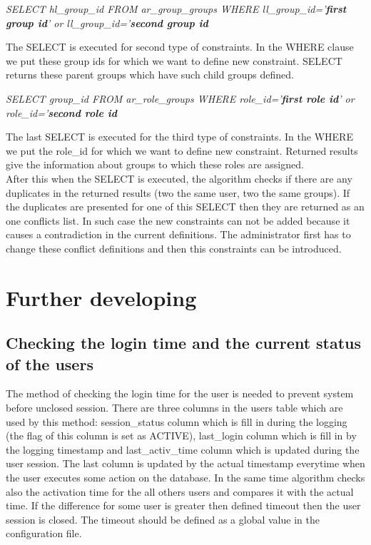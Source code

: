 \begin{center}
\emph{SELECT hl\_group\_id FROM ar\_group\_groups WHERE
ll\_group\_id='}\textbf{\emph{first group id}}\emph{' or ll\_group\_id='}\textbf{\emph{second group id}}
\end{center}
The SELECT is executed for second type of constraints. In the WHERE clause we put these group ids for which we want to define new constraint. SELECT returns these parent groups which have such child groups defined.\\
 
\begin{center}
\emph{SELECT group\_id FROM ar\_role\_groups WHERE
role\_id='}\textbf{\emph{first role id}}\emph{' or role\_id='}\textbf{\emph{second role id}}
\end{center}
The last SELECT is executed for the third type of constraints. In the WHERE we put the role\_id for which we want to define new constraint. Returned results give the information about groups to which these roles are assigned.\\

After this when the SELECT is executed, the algorithm checks if there are any duplicates in the returned results (two the same user, two the same groups). If the duplicates are presented  for one of this SELECT then they are returned as an one conflicts list. In such case the new constraints can not be added because it causes a contradiction in the current definitions. The administrator first has to change these conflict definitions and then this constraints can be introduced.
\newpage
\section{Further developing\label{furtherdev}}

\subsection{Checking the login time and the current status of the users\label{furtherdevchecking}}
The method of checking the login time for the user is needed to prevent system before unclosed session. There are three columns in the users table which are used by this method: session\_status column which is fill in during the logging (the flag of this column is set as ACTIVE), last\_login column which is fill in by the logging timestamp and last\_activ\_time column which is updated during the user session. The last column is updated by the actual timestamp everytime when the user executes some action on the database. In the same time algorithm checks also the activation time for the all others users and compares it with the actual time. If the difference for some user is greater then defined timeout then the user session is closed. The timeout should be defined as a global value in the configuration file.

